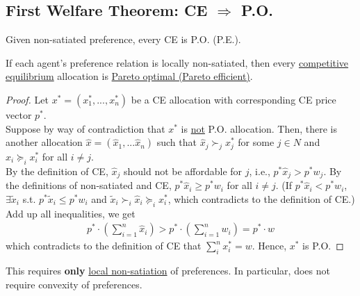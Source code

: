 \documentclass[11pt]{elegantbook}
\begin{document}
\subsection{First Welfare Theorem: CE $\Rightarrow$ P.O.}
Given non-satiated preference, every CE is P.O. (P.E.).
\begin{theorem}
    If each agent's preference relation is locally non-satiated, then every \underline{competitive equilibrium} allocation is \underline{Pareto optimal (Pareto efficient)}.
\end{theorem}
\begin{proof}
    Let $x^*=(x_1^*,...,x_n^*)$ be a CE allocation with corresponding CE price vector $p^*$.\\
    Suppose by way of contradiction that $x^*$ is \underline{not} P.O. allocation. Then, there is another allocation $\hat{x}=(\hat{x}_1,...\hat{x}_n)$ such that $\hat{x}_j\succ_j x^*_j$ for some $j\in N$ and $\hat{x}_i\succeq_i x^*_i$ for all $i\neq j$.\\
    By the definition of CE, $\hat{x}_j$ should not be affordable for $j$, i.e., $p^*\hat{x}_j>p^*w_j$. By the definitions of non-satiated and CE, $p^*\hat{x}_i\geq p^*w_i$ for all $i\neq j$. (If $p^*\hat{x}_i<p^*w_i$, $\exists \tilde{x}_i$ s.t. $p^*\tilde{x}_i\leq p^*w_i$ and $\tilde{x}_i\succ_i\hat{x}_i\succeq_i x_i^*$, which contradicts to the definition of CE.)\\
    Add up all inequalities, we get
    \begin{equation}
        \begin{aligned}
            p^*\cdot\left(\sum_{i=1}^n\hat{x}_i\right)> p^*\cdot\left(\sum_{i=1}^n w_i\right)=p^*\cdot w
        \end{aligned}
        \nonumber
    \end{equation}
    which contradicts to the definition of CE that $\sum_{i}^n x_i^*=w$. Hence, $x^*$ is P.O.
\end{proof}
\begin{note}
    This requires \textbf{only} \underline{local non-satiation} of preferences. In particular, does not require convexity of preferences.
\end{note}
\end{document}
